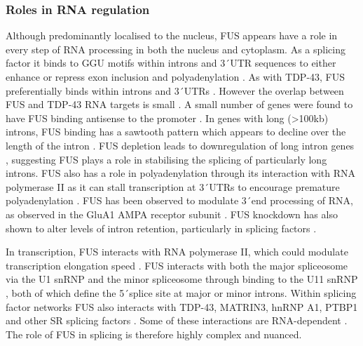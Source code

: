 \subsubsection{Roles in RNA regulation}

Although predominantly localised to the nucleus, FUS appears have a role in every step of RNA processing in both the nucleus and cytoplasm. 
As a splicing factor it binds to GGU motifs within introns and 3\'\ UTR sequences to either enhance or repress exon inclusion and polyadenylation \citep{Rogelj2012,Lagier-Tourenne2012}.
As with TDP-43, FUS preferentially binds within introns and 3\'\ UTRs \citep{Lagier-Tourenne2012,Rogelj2012,Ishigaki2012}. 
However the overlap between FUS and TDP-43 RNA targets is small  \citep{Lagier-Tourenne2012,Rogelj2012,Colombrita2012, Honda2014}.
A small number of genes were found to have FUS binding antisense to the promoter \citep{Ishigaki2012}.
In genes with long (>100kb) introns, FUS binding has a sawtooth pattern which appears to decline over the length of the intron \citep{Rogelj2012}. 
FUS depletion leads to downregulation of long intron genes \citep{Lagier-Tourenne2012}, suggesting FUS plays a role in stabilising the splicing of particularly long introns.
FUS also has a role in polyadenylation through its interaction with RNA polymerase II \citep{Schwartz2012} as it can stall transcription at 3\'\ UTRs to encourage premature polyadenylation \citep{Masuda2015}. 
FUS has been observed to modulate 3\'\ end processing of RNA, as observed in the GluA1 AMPA receptor subunit \citep{Udagawa2015}. %
FUS knockdown has also shown to alter levels of intron retention, particularly in splicing factors \citep{VanBlitterswijk2013, Nakaya2013}.

In transcription, FUS interacts with RNA polymerase II, which could modulate transcription elongation speed \citep{Schwartz2012}.
FUS interacts with both the major spliceosome via the U1 snRNP \citep{Sun2015a, Yu2015a} and the minor spliceosome through binding to  the U11 snRNP \citep{Reber2016}, both of which define the 5\'\ splice site at major or minor introns.
Within splicing factor networks FUS also interacts with TDP-43, MATRIN3, hnRNP A1, PTBP1 and other SR splicing factors \citep{Lagier-Tourenne2012,Yamaguchi2016,Yang1998,Meissner2003, Kamelgarn2016}. 
Some of these interactions are RNA-dependent \citep{Kamelgarn2016}.
The role of FUS in splicing is therefore highly complex and nuanced.

